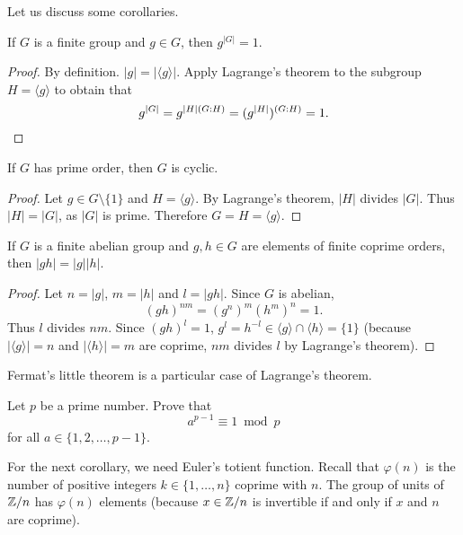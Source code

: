 Let us discuss some corollaries. 

\begin{corollary}
    If $G$ is a finite group and $g\in G$, then $g^{|G|}=1$.
\end{corollary}

\begin{proof}
    By definition. $|g|=|\langle g\rangle|$. Apply Lagrange's theorem 
    to the subgroup $H=\langle g\rangle$ to obtain that 
    \[
            g^{|G|}=g^{|H|(G:H)}=(g^{|H|})^{(G:H)}=1.\qedhere
    \]
\end{proof}

\begin{corollary}
    If $G$ has prime order, then $G$ is cyclic. 
\end{corollary}

\begin{proof}
    Let $g\in G\setminus\{1\}$ and $H=\langle g\rangle$. By Lagrange's theorem, 
    $|H|$ divides $|G|$. Thus $|H|=|G|$, as $|G|$ is prime. Therefore 
    $G=H=\langle g\rangle$.
\end{proof}

\begin{corollary}
\label{cor:coprime_orders}
    If $G$ is a finite abelian group and $g,h\in G$ are elements of finite coprime orders, 
    then 
    $|gh|=|g||h|$.
\end{corollary}

\begin{proof}
    Let $n=|g|$, $m=|h|$ and $l=|gh|$. Since $G$ is abelian,
    \[
    (gh)^{nm}=(g^n)^m(h^m)^n=1. 
    \]
    Thus $l$ divides $nm$. Since $(gh)^l=1$,
    $g^l=h^{-l}\in \langle g\rangle\cap\langle h\rangle=\{1\}$ 
    (because $|\langle g\rangle|=n$ and $|\langle h\rangle|=m$ are coprime, 
    $nm$ divides $l$ by Lagrange's theorem).
\end{proof}

Fermat's little theorem is a particular case of Lagrange's theorem. 

\begin{exercise}
    Let $p$ be a prime number. Prove that 
    \[a^{p-1}\equiv1\bmod p
    \]
    for all $a\in\{1,2,\dots,p-1\}$.
\end{exercise}

For the next corollary, we need Euler's totient function. 
Recall that 
$\varphi(n)$ is the number of positive integers $k\in\{1,\dots,n\}$
coprime with $n$. The group of units of 
$\mathbb{Z}/n$ has $\varphi(n)$ elements (because $x\in\mathbb{Z}/n$ is invertible
if and only if $x$ and $n$ are coprime).

